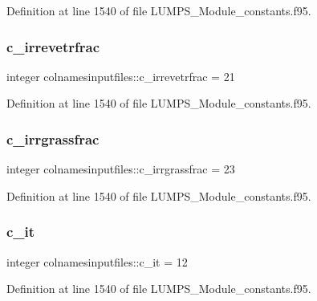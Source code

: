 Definition at line 1540 of file L\+U\+M\+P\+S\+\_\+\+Module\+\_\+constants.\+f95.

\mbox{\label{namespacecolnamesinputfiles_a469c588da4e0ea1e93f676a96c2b3f0d}} 
\subsubsection{\texorpdfstring{c\+\_\+irrevetrfrac}{c\_irrevetrfrac}}
{\footnotesize\ttfamily integer colnamesinputfiles\+::c\+\_\+irrevetrfrac = 21}



Definition at line 1540 of file L\+U\+M\+P\+S\+\_\+\+Module\+\_\+constants.\+f95.

\mbox{\label{namespacecolnamesinputfiles_ad67f646a9794ac7f54a585a7f2d7b8d8}} 
\subsubsection{\texorpdfstring{c\+\_\+irrgrassfrac}{c\_irrgrassfrac}}
{\footnotesize\ttfamily integer colnamesinputfiles\+::c\+\_\+irrgrassfrac = 23}



Definition at line 1540 of file L\+U\+M\+P\+S\+\_\+\+Module\+\_\+constants.\+f95.

\mbox{\label{namespacecolnamesinputfiles_a63b7102a0bfb2990c3d9ef7d9f3e7a76}} 
\subsubsection{\texorpdfstring{c\+\_\+it}{c\_it}}
{\footnotesize\ttfamily integer colnamesinputfiles\+::c\+\_\+it = 12}



Definition at line 1540 of file L\+U\+M\+P\+S\+\_\+\+Module\+\_\+constants.\+f95.

